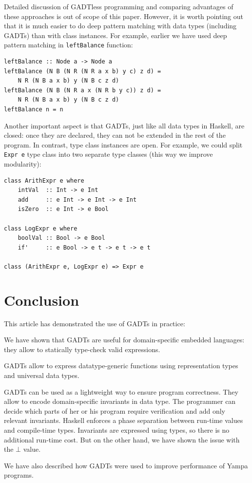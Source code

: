 \documentclass{tmr}
\begin{document}
Detailed discussion of GADTless programming and comparing advantages of these approaches is out of scope of this paper. However, it is worth pointing out that it is much easier to do deep pattern matching with data types (including GADTs) than with class instances. For example, earlier we have used deep pattern matching in \verb|leftBalance| function:

\begin{Verbatim}
leftBalance :: Node a -> Node a
leftBalance (N B (N R (N R a x b) y c) z d) =
    N R (N B a x b) y (N B c z d)
leftBalance (N B (N R a x (N R b y c)) z d) =
    N R (N B a x b) y (N B c z d)
leftBalance n = n
\end{Verbatim}

Another important aspect is that GADTs, just like all data types in Haskell, are closed: once they are declared, they can not be extended in the rest of the program. In contrast, type class instances are open. For example, we could split \verb|Expr e| type class into two separate type classes (this way we improve modularity):


\begin{Verbatim}
class ArithExpr e where
    intVal  :: Int -> e Int
    add     :: e Int -> e Int -> e Int
    isZero  :: e Int -> e Bool

class LogExpr e where
    boolVal :: Bool -> e Bool
    if'     :: e Bool -> e t -> e t -> e t
    
class (ArithExpr e, LogExpr e) => Expr e
\end{Verbatim}

\section{Conclusion}
\label{sec:conclusion}

This article has demonstrated the use of GADTs in practice:

\begin{longitem}
\item We have shown that GADTs are useful for domain-specific embedded languages: they allow to statically type-check valid expressions.
\item GADTs allow to express datatype-generic functions using representation types and universal data types.
\item GADTs can be used as a lightweight way to ensure program correctness. They allow to encode domain-specific invariants in data type. The programmer can decide which parts of her or his program require verification and add only relevant invariants. Haskell enforces a phase separation between run-time values and compile-time types. Invariants are expressed using types, so there is no additional run-time cost. But on the other hand, we have shown the issue with the $\bot$ value.
\item We have also described how GADTs were used to improve performance of Yampa programs.
\end{longitem}
\end{document}
